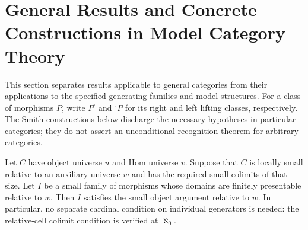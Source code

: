 \section{General Results and Concrete Constructions in Model Category Theory}

This section separates results applicable to general categories from their applications to the specified generating families and model structures.
For a class of morphisms $P$, write $P^{\square}$ and ${}^{\square}P$ for its right and left lifting classes, respectively.
The Smith constructions below discharge the necessary hypotheses in particular categories; they do not assert an unconditional recognition theorem for arbitrary categories.

\begin{resultblock}
\begin{theorem}
Let $C$ have object universe $u$ and Hom universe $v$.
Suppose that $C$ is locally small relative to an auxiliary universe $w$ and has the required small colimits of that size.
Let $I$ be a small family of morphisms whose domains are finitely presentable relative to $w$.
Then $I$ satisfies the small object argument relative to $w$.
In particular, no separate cardinal condition on individual generators is needed: the relative-cell colimit condition is verified at $\aleph_0$.
\end{theorem}
\end{resultblock}

